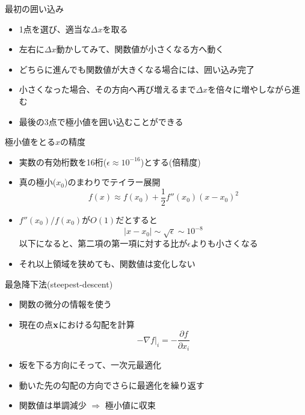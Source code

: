 \documentclass[dvipdfmx]{beamer}
\begin{document}
\begin{frame}[t,fragile]{最初の囲い込み}
  \begin{itemize}
    \setlength{\itemsep}{1em}
  \item 1点を選び、適当な$\Delta x$を取る
  \item 左右に$\Delta x$動かしてみて、関数値が小さくなる方へ動く
  \item どちらに進んでも関数値が大きくなる場合には、囲い込み完了
  \item 小さくなった場合、その方向へ再び増えるまで$\Delta x$を倍々に増やしながら進む
  \item 最後の3点で極小値を囲い込むことができる
  \end{itemize}
\end{frame}

\begin{frame}[t,fragile]{極小値をとる$x$の精度}
  \begin{itemize}
    \setlength{\itemsep}{1em}
  \item 実数の有効桁数を16桁($\epsilon \approx 10^{-16}$)とする(倍精度)
  \item 真の極小($x_0$)のまわりでテイラー展開
    \[
    f(x) \approx f(x_0) + \frac{1}{2} f''(x_0) (x-x_0)^2
    \]
  \item $f''(x_0) / f(x_0)$が$O(1)$だとすると
    \[
    |x-x_0| \sim \sqrt{\epsilon} \sim 10^{-8}
    \]
    以下になると、第二項の第一項に対する比が$\epsilon$よりも小さくなる
  \item それ以上領域を狭めても、関数値は変化しない
  \end{itemize}
\end{frame}

\begin{frame}[t,fragile]{最急降下法(steepest-descent)}
  \begin{itemize}
    \setlength{\itemsep}{1em}
  \item 関数の微分の情報を使う
  \item 現在の点$\bf x$における勾配を計算
    \[
    -\nabla f|_i = -\frac{\partial f}{\partial x_i}
    \]
  \item 坂を下る方向にそって、一次元最適化
  \item 動いた先の勾配の方向でさらに最適化を繰り返す
  \item 関数値は単調減少 $\Rightarrow$ 極小値に収束
  \end{itemize}
\end{frame}
\end{document}
